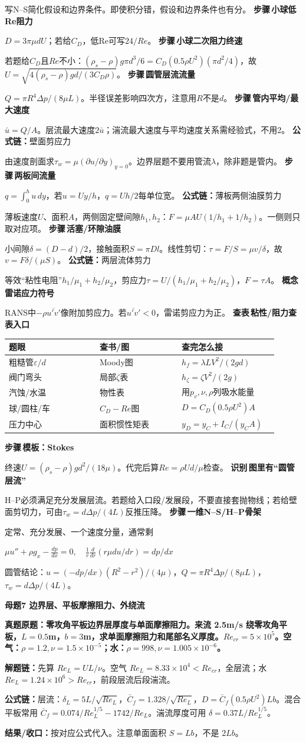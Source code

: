 \documentclass[a4paper]{article}
\newcommand{\mt}[1]{\vspace{0.22pt}\colorbox{M}{\parbox{\dimexpr\linewidth-2\fboxsep}{\color{white}\bfseries #1}}\par}
\newcommand{\qt}[1]{\vspace{0.10pt}\colorbox{Q}{\parbox{\dimexpr\linewidth-2\fboxsep}{\color{white}\bfseries #1}}\par}
\newcommand{\ans}[1]{\colorbox{G}{\parbox{\dimexpr\linewidth-2\fboxsep}{#1}}\par}
\newcommand{\chain}[1]{{\color{A}\bfseries 解题链：}#1\par}
\newcommand{\res}[1]{{\color{E}\bfseries 结果/收口：}#1\par}
\newcommand{\form}[1]{{\color{M}\bfseries 公式链：}#1\par}
\newcommand{\fmlb}[1]{\ans{\begin{adjustbox}{max width=.96\linewidth}$\displaystyle #1$\end{adjustbox}}}
\newcommand{\labtag}[3]{{\bfseries\color{#1}\colorbox{#1}{\color{white}\fontsize{2.18}{2.28}\selectfont #2}\,#3}\par}
\newcommand{\iden}[1]{\labtag{C}{识别}{#1}}
\newcommand{\step}[1]{\labtag{S}{步骤}{#1}}
\newcommand{\lookup}[1]{\labtag{C}{查表}{#1}}
\newcommand{\concept}[1]{\labtag{V}{概念}{#1}}
\newcommand{\idq}[1]{\iden{#1}}
\newcommand{\stepq}[1]{\step{#1}}
\newcommand{\formq}[1]{\form{#1}}
\newcommand{\lookq}[1]{\lookup{#1}}
\newcommand{\conceptq}[1]{\concept{#1}}
\newenvironment{vfourWrap}{\par\begingroup\fontsize{2.66}{2.80}\selectfont\setlength{\fboxsep}{0.38pt}}{\par\endgroup}
\begin{document}
\begin{multicols}{3}
\begin{vfourWrap}
写N--S简化假设和边界条件。即使积分错，假设和边界条件也有分。
\stepq{小球低Re阻力}
$D=3\pi\mu dU$；若给$C_D$，低Re可写$24/Re$。
\stepq{小球二次阻力终速}
若题给$C_D$且$Re$不小：$(\rho_s-\rho)g\pi d^3/6=C_D(0.5\rho U^2)(\pi d^2/4)$，故$U=\sqrt{4(\rho_s-\rho)gd/(3C_D\rho)}$。
\stepq{圆管层流流量}
$Q=\pi R^4\Delta p/(8\mu L)$。半径误差影响四次方，注意用$R$不是$d$。
\stepq{管内平均/最大速度}
$\bar u=Q/A$。层流最大速度$2\bar u$；湍流最大速度与平均速度关系需经验式，不用2。
\formq{壁面剪应力}
由速度剖面求$\tau_w=\mu(\partial u/\partial y)_{y=0}$。边界层题不要用管流$\lambda$，除非题是管内。
\stepq{两板间流量}
$q=\int_0^hu\,dy$，若$u=Uy/h$，$q=Uh/2$每单位宽。
\formq{薄板两侧油膜剪力}
薄板速度$U$、面积$A$，两侧固定壁间隙$h_1,h_2$：$F=\mu AU(1/h_1+1/h_2)$。一侧则只取对应项。
\stepq{活塞/环隙油膜}
小间隙$\delta=(D-d)/2$，接触面积$S=\pi Dl$。线性剪切：$\tau=F/S=\mu v/\delta$，故$v=F\delta/(\mu S)$。
\formq{两层流体剪力}
等效“粘性电阻”$h_1/\mu_1+h_2/\mu_2$，剪应力$\tau=U/(h_1/\mu_1+h_2/\mu_2)$，$F=\tau A$。
\conceptq{雷诺应力符号}
RANS中$-\rho\overline{u'v'}$像附加剪应力。若$\overline{u'v'}<0$，雷诺剪应力为正。
\lookq{粘性/阻力查表入口}
\begin{tabular}{|p{0.31\linewidth}|p{0.28\linewidth}|p{0.33\linewidth}|}\hline
题眼 & 查书/图 & 查完怎么接\\\hline
粗糙管$\varepsilon/d$ & Moody图 & $h_f=\lambda L V^2/(2gd)$\\\hline
阀门弯头 & 局部$\zeta$表 & $h_\zeta=\zeta V^2/(2g)$\\\hline
汽蚀/水温 & 物性表 & 用$p_v,\nu,\rho$列吸水能量\\\hline
球/圆柱/车 & $C_D-Re$图 & $D=C_D(0.5\rho U^2)A$\\\hline
压力中心 & 面积惯性矩表 & $y_D=y_C+I_C/(y_CA)$\\\hline
\end{tabular}
\stepq{模板：Stokes}
终速$U=(\rho_s-\rho)gd^2/(18\mu)$。代完后算$Re=\rho Ud/\mu$检查。
\idq{图里有“圆管层流”}
H--P必须满足充分发展层流。若题给入口段/发展段，不要直接套抛物线；若给壁面剪切力，可由$\tau_w=d\Delta p/(4L)$反推压降。
\stepq{一维N--S/H--P骨架}
定常、充分发展、一个速度分量，通常剩
\fmlb{\mu u''+\rho g_x-\frac{dp}{dx}=0,\quad \frac1r\frac d{dr}(r\mu du/dr)=dp/dx}
圆管结论：$u=(-dp/dx)(R^2-r^2)/(4\mu)$，$Q=\pi R^4\Delta p/(8\mu L)$，$\tau_w=d\Delta p/(4L)$。
\end{vfourWrap}
\mt{母题7 边界层、平板摩擦阻力、外绕流}
\qt{真题原题：零攻角平板边界层厚度与单面摩擦阻力。来流 2.5m/s 绕零攻角平板，$L=0.5$m，$b=3$m，求单面摩擦阻力和尾部名义厚度。$Re_{cr}=5\times10^5$。空气：$\rho=1.2,\nu=1.5\times10^{-5}$；水：$\rho=998,\nu=1.005\times10^{-6}$。}
\chain{先算 $Re_L=UL/\nu$。空气 $Re_L=8.33\times10^4<Re_{cr}$，全层流；水 $Re_L=1.24\times10^6>Re_{cr}$，前段层流后段湍流。}
\form{层流：$\delta_L=5L/\sqrt{Re_L}$，$\bar C_f=1.328/\sqrt{Re_L}$，$D=\bar C_f(0.5\rho U^2)Lb$。混合平板常用 $\bar C_f=0.074/Re_L^{1/5}-1742/Re_L$。湍流厚度可用 $\delta=0.37L/Re_L^{1/5}$。}
\res{按对应公式代入。注意单面面积 $S=Lb$，不是 $2Lb$。}


\end{multicols}
\end{document}
